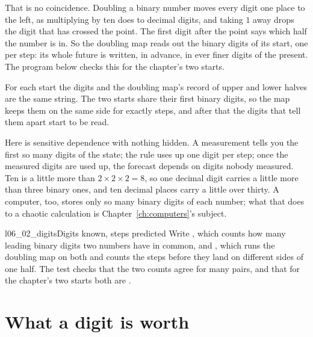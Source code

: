 That is no coincidence. Doubling a binary number moves every digit one place
to the left, as multiplying by ten does to decimal digits, and taking $1$
away drops the digit that has crossed the point. The first digit after the
point says which half the number is in. So the doubling map reads out the
binary digits of its start, one per step: its whole future is written, in
advance, in ever finer digits of the present. The program below checks
this for the chapter's two starts.



\noindent
For each start the digits and the doubling map's record of upper and lower
halves are the same string. The two starts share their first
 binary digits, so the map keeps them on the same side
for exactly  steps, and after that the digits that
tell them apart start to be read.

Here is sensitive dependence with nothing hidden. A measurement tells you the
first so many digits of the state; the rule uses up one digit per step; once
the measured digits are used up, the forecast depends on digits nobody
measured. Ten is a little more than $2 \times 2 \times 2 = 8$, so one decimal
digit carries a little more than three binary ones, and ten decimal places
carry a little over thirty. A computer, too, stores only so many binary digits of
each number; what that does to a chaotic calculation is
Chapter~\ref{ch:computers}'s subject.


\begin{lab}{l06_02_digits}{Digits known, steps predicted}
Write , which counts how many leading binary digits two
numbers have in common, and , which runs the doubling
map on both and counts the steps before they land on different sides of one
half. The test checks that the two counts agree for many pairs, and that
for the chapter's two starts both are .
\end{lab}

\section{What a digit is worth}
\label{sec:ch06-worth}

